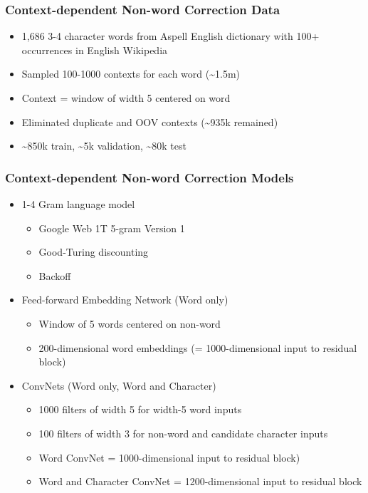 \begin{frame}
\frametitle{Context-dependent Non-word Correction Data}
\begin{itemize}
    \item 1,686 3-4 character words from Aspell English dictionary with 100+ occurrences in English Wikipedia
    \item Sampled 100-1000 contexts for each word ({\textasciitilde}1.5m)
    \item Context = window of width 5 centered on word 
    \item Eliminated duplicate and OOV contexts ({\textasciitilde}935k remained)
    \item {\textasciitilde}850k train, {\textasciitilde}5k validation, {\textasciitilde}80k test 
\end{itemize}
\end{frame}

\begin{frame}
\frametitle{Context-dependent Non-word Correction Models}
\begin{itemize}
    \item 1-4 Gram language model 
        \begin{itemize}
            \item Google Web 1T 5-gram Version 1 
            \item Good-Turing discounting
            \item Backoff
        \end{itemize}
    \item Feed-forward Embedding Network (Word only)
        \begin{itemize}
            \item Window of 5 words centered on non-word
            \item 200-dimensional word embeddings (= 1000-dimensional input to residual block)
        \end{itemize}
    \item ConvNets (Word only, Word and Character)
        \begin{itemize}
            \item 1000 filters of width 5 for width-5 word inputs
            \item 100 filters of width 3 for non-word and candidate character inputs
            \item Word ConvNet = 1000-dimensional input to residual block)
            \item Word and Character ConvNet = 1200-dimensional input to residual block
        \end{itemize}
\end{itemize}
\end{frame}

